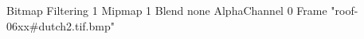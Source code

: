 {Bitmap
	{Filtering 1}
	{Mipmap 1}
	{Blend none}
	{AlphaChannel 0}
	{Frame "roof-06xx#dutch2.tif.bmp"}
}
